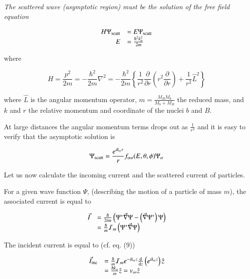\documentclass[a4paper,14pt]{book}
\begin{document}
{\it The scattered wave (asymptotic region) must be the solution of the free field equation}

\begin{equation}
\begin{array}{rl}
H \Psi_{\rm scatt} &= E \Psi_{\rm scatt} \\
E &= \frac{\hbar^2 k_{\alpha}^2}{2m}
\end{array}
\end{equation}

\noindent where

\begin{equation}
H = \frac{p^2}{2m} = - \frac{\hbar^2}{2m} \nabla^2 = - \frac{\hbar^2}{2m} \left\{ \frac{1}{r^2} \frac{\partial}{\partial r} \left( r^2 \frac{\partial}{\partial r} \right) + \frac{1}{r^2} \hat{L}^2 \right\}
\end{equation}

\noindent where $\hat{L}$ is the angular momentum operator, $m = \frac{M_B M_b}{M_b + M_B}$ the reduced mass, and $k$ and $r$ the relative momentum and coordinate of the nuclei $b$ and $B$.

\noindent At large distances the angular momentum terms drops out as $\frac{1}{r^2}$ and it is easy to verify that the asymptotic solution is

\begin{equation}
\Psi_{\rm scatt} = \frac{e^{ik_{\alpha} r}}{r} f_{\alpha \alpha}(E, \theta, \phi) \Psi_{\alpha}
\end{equation}

\noindent Let us now calculate the incoming current and the scattered current of particles.

For a given wave function $\Psi$, (describing the motion of a particle of mass $m$), the associated current is equal to

\begin{equation}
\begin{array}{rl}
\vec{I} &= \frac{\hbar}{2im} \left( \Psi^* \vec{\nabla} \Psi - \left( \vec{\nabla} \Psi^* \right) \Psi \right) \\
&= \frac{\hbar}{m} {\cal I}_m \left( \Psi^* \vec{\nabla} \Psi \right)
\end{array}
\end{equation}

The incident current is equal to (cf. eq. (9))

\begin{equation}
\begin{array}{rl}
\vec{I}_{\rm inc} &= \frac{\hbar}{m} {\cal I}_m e^{-i k_{\alpha} z} \frac{\rm d}{{\rm d}z} \left( e^{i k_{\alpha} z} \right) \hat{z} \\
&= \frac{\hbar k_{\alpha}}{m} \hat{z} = v_{\infty} \hat{z}
\end{array}
\end{equation}
\end{document}
